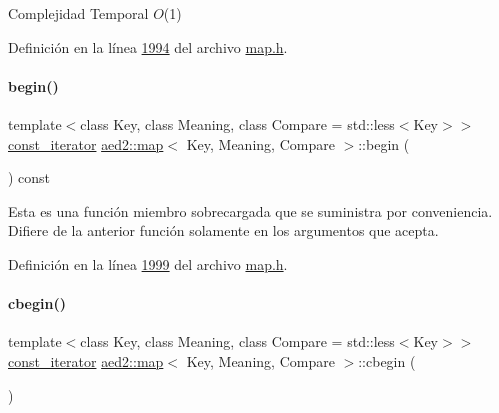 \begin{DoxyDescription}
\item[Complejidad Temporal]$O$(1)
\end{DoxyDescription}

Definición en la línea \hyperlink{map_8h_source_l01994}{1994} del archivo \hyperlink{map_8h_source}{map.\+h}.

\mbox{\label{classaed2_1_1map_af3b1818c2b44e37221cc3b131768555b_af3b1818c2b44e37221cc3b131768555b}} 
\paragraph{\texorpdfstring{begin()}{begin()}\hspace{0.1cm}{\footnotesize\ttfamily [2/2]}}
{\footnotesize\ttfamily template$<$class Key, class Meaning, class Compare = std\+::less$<$\+Key$>$$>$ \\
\hyperlink{classaed2_1_1map_1_1const__iterator}{const\+\_\+iterator} \hyperlink{classaed2_1_1map}{aed2\+::map}$<$ Key, Meaning, Compare $>$\+::begin (\begin{DoxyParamCaption}{ }\end{DoxyParamCaption}) const\hspace{0.3cm}{\ttfamily [inline]}}

Esta es una función miembro sobrecargada que se suministra por conveniencia. Difiere de la anterior función solamente en los argumentos que acepta. 

Definición en la línea \hyperlink{map_8h_source_l01999}{1999} del archivo \hyperlink{map_8h_source}{map.\+h}.

\mbox{\label{classaed2_1_1map_ab96ad892caa28f193481a578f4956a2a_ab96ad892caa28f193481a578f4956a2a}} 
\paragraph{\texorpdfstring{cbegin()}{cbegin()}}
{\footnotesize\ttfamily template$<$class Key, class Meaning, class Compare = std\+::less$<$\+Key$>$$>$ \\
\hyperlink{classaed2_1_1map_1_1const__iterator}{const\+\_\+iterator} \hyperlink{classaed2_1_1map}{aed2\+::map}$<$ Key, Meaning, Compare $>$\+::cbegin (\begin{DoxyParamCaption}{ }\end{DoxyParamCaption})\hspace{0.3cm}{\ttfamily [inline]}}

